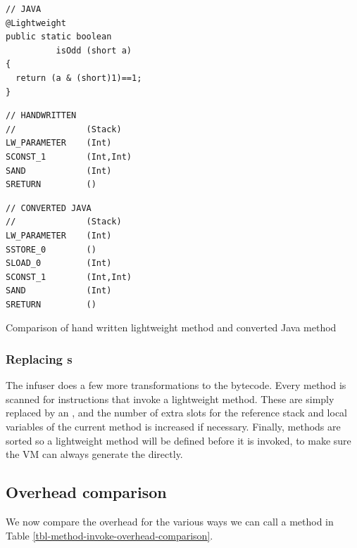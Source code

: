 \begin{listing}
 \centering
 \begin{minipage}[t]{0.32\textwidth}
  \centering
  \begin{verbatim}
// JAVA
@Lightweight
public static boolean
          isOdd (short a)
{
  return (a & (short)1)==1;
}
  \end{verbatim}
 \end{minipage}\hfill
 \begin{minipage}[t]{0.29\textwidth}
  \centering
  \begin{verbatim}
// HANDWRITTEN
//              (Stack)
LW_PARAMETER    (Int)
SCONST_1        (Int,Int)
SAND            (Int)
SRETURN         ()
  \end{verbatim}
 \end{minipage}\hfill
 \begin{minipage}[t]{0.29\textwidth}
  \centering
  \begin{verbatim}
// CONVERTED JAVA
//              (Stack)
LW_PARAMETER    (Int)
SSTORE_0        ()
SLOAD_0         (Int)
SCONST_1        (Int,Int)
SAND            (Int)
SRETURN         ()
  \end{verbatim}
 \end{minipage}
 \vspace{0.5cm}

\caption{Comparison of hand written lightweight method and converted Java method}
\label{lst-comparison-of-handwritten-and-converted-java-lw-method}
\end{listing}

\subsubsection{Replacing s}
The infuser does a few more transformations to the bytecode. Every method is scanned for  instructions that invoke a lightweight method. These are simply replaced by an , and the number of extra slots for the reference stack and local variables of the current method is increased if necessary. Finally, methods are sorted so a lightweight method will be defined before it is invoked, to make sure the VM can always generate the  directly.

\subsection{Overhead comparison}
We now compare the overhead for the various ways we can call a method in Table \ref{tbl-method-invoke-overhead-comparison}.

